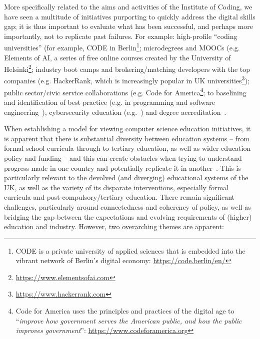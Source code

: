 \documentclass[conference]{IEEEtran}
\begin{document}
More specifically related to the aims and activities of the Institute
of Coding, we have seen a multitude of initiatives purporting to
quickly address the digital skills gap; it is thus important to
evaluate what has been successful, and perhaps more importantly, not
to replicate past failures. For example: high-profile ``coding
universities'' (for example, CODE in Berlin\footnote{CODE is a private
university of applied sciences that is embedded into the vibrant
network of Berlin’s digital economy: \url{https://code.berlin/en/}};
microdegrees and MOOCs (e.g. Elements of AI, a series of free online
courses created by the University of
Helsinki\footnote{\url{https://www.elementsofai.com}}; industry boot
camps and brokering/matching developers with the top companies
(e.g. HackerRank, which is increasingly popular in UK
universities\footnote{\url{https://www.hackerrank.com}}); public
sector/civic service collaborations (e.g. Code for
America\footnote{Code for America uses the principles and practices of
the digital age to ``{\emph{improve how government serves the American
public, and how the public improves government}}'':
\url{https://www.codeforamerica.org}}; to baselining and
identification of best practice (e.g. in programming and software
engineering~\cite{murphy-et-al:programming2017}), cybersecurity
education (e.g.~\cite{crick-et-al:fie2019, itnowcyber:2019}) and
degree accreditation~\cite{crick-et-al:cep2020}.

When establishing a model for viewing computer science education
initiatives, it is apparent that there is substantial diversity
between education systems -- from formal school curricula through to
tertiary education, as well as wider education policy and funding --
and this can create obstacles when trying to understand progress made
in one country and potentially replicate it in
another~\cite{hubwieser:2013,falkner-et-al:2019}. This is particularly
relevant to the devolved (and diverging) educational systems of the
UK, as well as the variety of its disparate interventions, especially
formal curricula and post-compulsory/tertiary education.  There remain
significant challenges, particularly around connectedness and
coherency of policy, as well as bridging the gap between the
expectations and evolving requirements of (higher) education and
industry. However, two overarching themes are apparent:
\end{document}
